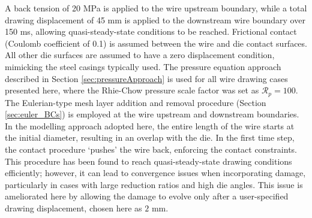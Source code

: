 \documentclass[sn-mathphys,Numbered]{sn-jnl}%
\begin{document}
A back tension of 20 MPa is applied to the wire upstream boundary, while a total drawing displacement of 45 mm is applied to the downstream wire boundary over 150 ms, allowing quasi-steady-state conditions to be reached.
Frictional contact (Coulomb coefficient of 0.1) is assumed between the wire and die contact surfaces.
All other die surfaces are assumed to have a zero displacement condition, mimicking the steel casings typically used.
The pressure equation approach described in Section \ref{sec:pressureApproach} is used for all wire drawing cases presented here, where the Rhie-Chow pressure scale factor was set as $\mathcal{R}_p = 100$.
The Eulerian-type mesh layer addition and removal procedure (Section \ref{sec:euler_BCs}) is employed at the wire upstream and 
downstream boundaries.
In the modelling approach adopted here, the entire length of the wire starts at the initial diameter, resulting in an overlap with the die.
In the first time step, the contact procedure `pushes' the wire back, enforcing the contact constraints.
This procedure has been found to reach quasi-steady-state drawing conditions efficiently; however,
it can lead to convergence issues when incorporating damage, particularly in cases with large reduction ratios and high die angles. %
This issue is ameliorated here by allowing the damage to evolve only after a user-specified drawing displacement, chosen here as $2$ mm.
\end{document}
